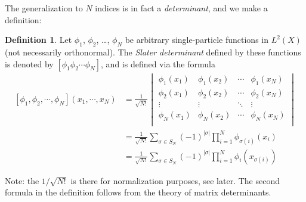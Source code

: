 \documentclass{report}
\theoremstyle{plain}
\theoremstyle{definition}
\newtheorem{definition}{Definition}[chapter]
\begin{document}
The generalization to $N$ indices is in fact a \emph{determinant}, and
we make a definition:
\begin{definition}
  Let $\phi_1$, $\phi_2$, \ldots, $\phi_N$ be arbitrary
  single-particle functions in $L^2(X)$ (not necessarily
  orthonormal). The \emph{Slater determinant} defined by these
  functions is denoted by $[\phi_1\phi_2\cdots\phi_N]$, and is defined via the formula
  \begin{equation}
    \begin{split}
    [\phi_1,\phi_2,\cdots,\phi_N](x_1,\cdots,x_N) &= \frac{1}{\sqrt{N!}} \begin{vmatrix}
      \phi_1(x_1) & \phi_1(x_2) & \cdots & \phi_1(x_N) \\
      \phi_2(x_1) & \phi_2(x_2) & \cdots & \phi_2(x_N) \\
      \vdots & \vdots & \ddots & \vdots \\
      \phi_N(x_1) & \phi_N(x_2) & \cdots & \phi_N(x_N) \\
    \end{vmatrix}\label{eq:slater} \\
    &= \frac{1}{\sqrt{N!}} \sum_{\sigma\in S_N}
  (-1)^{|\sigma|} \prod_{i=1}^N \phi_{\sigma(i)}(x_i)\\
    &= \frac{1}{\sqrt{N!}} \sum_{\sigma\in S_N}
  (-1)^{|\sigma|} \prod_{i=1}^N \phi_{i}(x_{\sigma(i)})
  \end{split}
\end{equation}
\end{definition}

Note: the $1/\sqrt{N!}$ is there for normalization purposes, see
later. The second formula in the definition follows from the theory of
matrix determinants.

\end{document}
